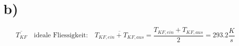 

\section*{b)}
\[
\overline{T_{KF}} \quad \text{ideale Fliessigkeit:} \quad \overline{T_{KF, ein} + T_{KF, aus}} = \frac{T_{KF, ein} + T_{KF, aus}}{2} = 293.2 \frac{K}{s}
\]